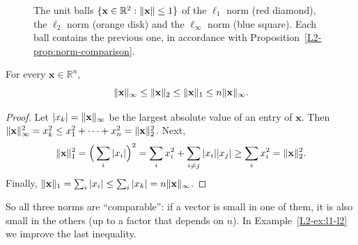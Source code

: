 \begin{figure}[ht]
    \centering
    \caption[Unit balls of the $\ell_1$, $\ell_2$ and $\ell_\infty$ norms]{The unit balls $\{\mathbf{x} \in \mathbb{R}^2 : \lVert \mathbf{x} \rVert \leq 1\}$ of the $\ell_1$ norm (red diamond), the $\ell_2$ norm (orange disk) and the $\ell_\infty$ norm (blue square). Each ball contains the previous one, in accordance with Proposition~\ref{L2-prop:norm-comparison}.}
    \label{L2-fig:unit-balls}
\end{figure}

\begin{proposition}\label{L2-prop:norm-comparison}
    For every $\mathbf{x} \in \mathbb{R}^n$,
    \[\lVert \mathbf{x} \rVert_\infty \leq \lVert \mathbf{x} \rVert_2 \leq \lVert \mathbf{x} \rVert_1 \leq n \lVert \mathbf{x} \rVert_\infty.\]
\end{proposition}

\begin{proof}
    Let $|x_k| = \lVert \mathbf{x} \rVert_\infty$ be the largest absolute value of an entry of $\mathbf{x}$. Then $\lVert \mathbf{x} \rVert_\infty^2 = x_k^2 \leq x_1^2 + \cdots + x_n^2 = \lVert \mathbf{x} \rVert_2^2$. Next,
    \[\lVert \mathbf{x} \rVert_1^2 = \Big(\sum_i |x_i|\Big)^2 = \sum_i x_i^2 + \sum_{i \neq j} |x_i| |x_j| \geq \sum_i x_i^2 = \lVert \mathbf{x} \rVert_2^2.\]
    Finally, $\lVert \mathbf{x} \rVert_1 = \sum_i |x_i| \leq \sum_i |x_k| = n \lVert \mathbf{x} \rVert_\infty$.
\end{proof}

So all three norms are ``comparable'': if a vector is small in one of them, it is also small in the others (up to a factor that depends on $n$). In Example~\ref{L2-ex:l1-l2} we improve the last inequality.

